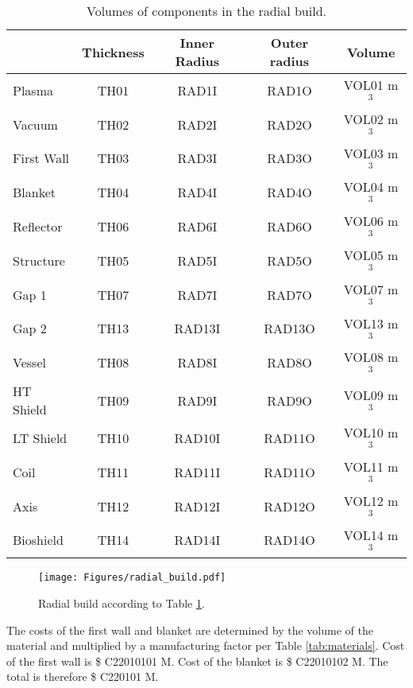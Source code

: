 \begin{table}[h!]
    \centering
    \begin{tabular}{l c  c c c}
        \hline
        &	Thickness	&	Inner Radius	&	Outer radius	&	Volume		\\
        \hline
        Plasma	&	TH01	&	RAD1I	&	RAD1O	&	VOL01	m$^{3}$	\\
        Vacuum	&	TH02	&	RAD2I	&	RAD2O	&	VOL02	m$^{3}$	\\
        First Wall	&	TH03	&	RAD3I	&	RAD3O	&	VOL03	m$^{3}$	\\
        Blanket	&	TH04	&	RAD4I	&	RAD4O	&	VOL04	m$^{3}$	\\
        Reflector	&	TH06	&	RAD6I	&	RAD6O	&	VOL06	m$^{3}$	\\
        Structure	&	TH05	&	RAD5I	&	RAD5O	&	VOL05	m$^{3}$	\\
        Gap	1 &	TH07	&	RAD7I	&	RAD7O	&	VOL07	m$^{3}$	\\
        Gap 2	&	TH13	&	RAD13I	&	RAD13O	&	VOL13	m$^{3}$	\\
        Vessel	&	TH08	&	RAD8I	&	RAD8O	&	VOL08	m$^{3}$	\\
        HT Shield	&	TH09	&	RAD9I	&	RAD9O	&	VOL09	m$^{3}$	\\
        LT Shield	&	TH10	&	RAD10I	&	RAD11O	&	VOL10	m$^{3}$	\\
        Coil	&	TH11	&	RAD11I	&	RAD11O	&	VOL11	m$^{3}$	\\
        Axis	&	TH12	&	RAD12I	&	RAD12O	&	VOL12	m$^{3}$	\\
        Bioshield	&	TH14	&	RAD14I	&	RAD14O	&	VOL14	m$^{3}$	\\
        \hline
    \end{tabular}
    \caption{Volumes of components in the radial build.}
    \label{tab:volumes}
\end{table}

\begin{figure}
    \centering
    \texttt{[image: Figures/radial\_build.pdf]}
    \caption{Radial build according to Table \ref{tab:volumes}.}
    \label{fig:radial}
\end{figure}



The costs of the first wall and blanket are determined by the volume of the material and multiplied by a manufacturing factor per Table \ref{tab:materials}.   Cost of the first wall is \$ C22010101 M.  Cost of the blanket is \$ C22010102 M. The total is therefore \$ C220101 M.

